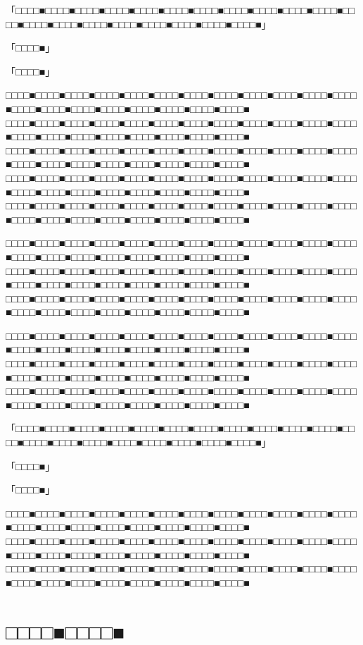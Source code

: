 \documentclass[
tate,
book,
openany,
paper={202mm,270mm},
oneside,
fontsize=9pt, %
jafontsize=9pt, %
head_space=11truemm, %
gutter=8truemm, %
line_length=78zw, %
number_of_lines=35, %
column_gap=5truemm,%
headfoot_verticalposition=4truemm,%
draft
]{jlreq}
\begin{document}
\begin{multicols*}{3}
「□□□□■□□□□■□□□□■□□□□■□□□□■□□□□■□□□□■□□□□■□□□□■□□□□■□□□□■□□□□■□□□□■□□□□■□□□□■□□□□■□□□□■□□□□■□□□□■□□□□■」

「□□□□■」

「□□□□■」

□□□□■□□□□■□□□□■□□□□■□□□□■□□□□■□□□□■□□□□■□□□□■□□□□■□□□□■□□□□■□□□□■□□□□■□□□□■□□□□■□□□□■□□□□■□□□□■□□□□■
□□□□■□□□□■□□□□■□□□□■□□□□■□□□□■□□□□■□□□□■□□□□■□□□□■□□□□■□□□□■□□□□■□□□□■□□□□■□□□□■□□□□■□□□□■□□□□■□□□□■
□□□□■□□□□■□□□□■□□□□■□□□□■□□□□■□□□□■□□□□■□□□□■□□□□■□□□□■□□□□■□□□□■□□□□■□□□□■□□□□■□□□□■□□□□■□□□□■□□□□■
□□□□■□□□□■□□□□■□□□□■□□□□■□□□□■□□□□■□□□□■□□□□■□□□□■□□□□■□□□□■□□□□■□□□□■□□□□■□□□□■□□□□■□□□□■□□□□■□□□□■
□□□□■□□□□■□□□□■□□□□■□□□□■□□□□■□□□□■□□□□■□□□□■□□□□■□□□□■□□□□■□□□□■□□□□■□□□□■□□□□■□□□□■□□□□■□□□□■□□□□■

□□□□■□□□□■□□□□■□□□□■□□□□■□□□□■□□□□■□□□□■□□□□■□□□□■□□□□■□□□□■□□□□■□□□□■□□□□■□□□□■□□□□■□□□□■□□□□■□□□□■
□□□□■□□□□■□□□□■□□□□■□□□□■□□□□■□□□□■□□□□■□□□□■□□□□■□□□□■□□□□■□□□□■□□□□■□□□□■□□□□■□□□□■□□□□■□□□□■□□□□■
□□□□■□□□□■□□□□■□□□□■□□□□■□□□□■□□□□■□□□□■□□□□■□□□□■□□□□■□□□□■□□□□■□□□□■□□□□■□□□□■□□□□■□□□□■□□□□■□□□□■

□□□□■□□□□■□□□□■□□□□■□□□□■□□□□■□□□□■□□□□■□□□□■□□□□■□□□□■□□□□■□□□□■□□□□■□□□□■□□□□■□□□□■□□□□■□□□□■□□□□■
□□□□■□□□□■□□□□■□□□□■□□□□■□□□□■□□□□■□□□□■□□□□■□□□□■□□□□■□□□□■□□□□■□□□□■□□□□■□□□□■□□□□■□□□□■□□□□■□□□□■
□□□□■□□□□■□□□□■□□□□■□□□□■□□□□■□□□□■□□□□■□□□□■□□□□■□□□□■□□□□■□□□□■□□□□■□□□□■□□□□■□□□□■□□□□■□□□□■□□□□■

「□□□□■□□□□■□□□□■□□□□■□□□□■□□□□■□□□□■□□□□■□□□□■□□□□■□□□□■□□□□■□□□□■□□□□■□□□□■□□□□■□□□□■□□□□■□□□□■□□□□■」

「□□□□■」

「□□□□■」

□□□□■□□□□■□□□□■□□□□■□□□□■□□□□■□□□□■□□□□■□□□□■□□□□■□□□□■□□□□■□□□□■□□□□■□□□□■□□□□■□□□□■□□□□■□□□□■□□□□■
□□□□■□□□□■□□□□■□□□□■□□□□■□□□□■□□□□■□□□□■□□□□■□□□□■□□□□■□□□□■□□□□■□□□□■□□□□■□□□□■□□□□■□□□□■□□□□■□□□□■
□□□□■□□□□■□□□□■□□□□■□□□□■□□□□■□□□□■□□□□■□□□□■□□□□■□□□□■□□□□■□□□□■□□□□■□□□□■□□□□■□□□□■□□□□■□□□□■□□□□■


\end{multicols*}
\part{□□□□■□□□□■}
\end{document}
